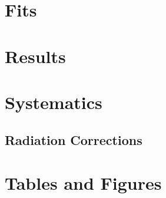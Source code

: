 \documentclass[11pt]{article}
\begin{document}
\section{Fits}
\section{Results}
\section{Systematics}
\subsection{Radiation Corrections}
\newpage
\section{Tables and Figures}
\end{document}
